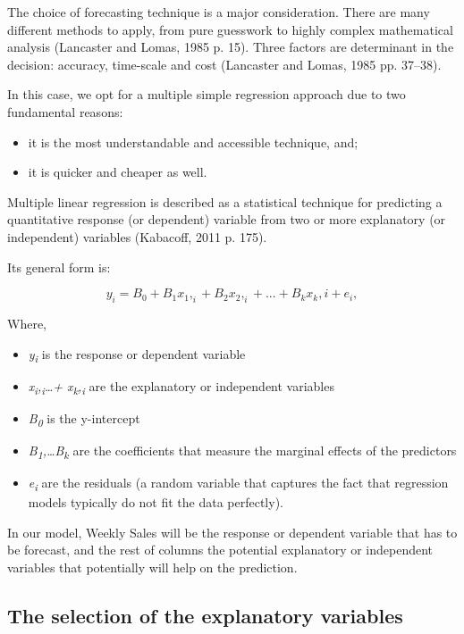 \documentclass[11pt,]{article}
\providecommand{\tightlist}{%
  \setlength{\itemsep}{0pt}\setlength{\parskip}{0pt}}
\begin{document}
The choice of forecasting technique is a major consideration. There are
many different methods to apply, from pure guesswork to highly complex
mathematical analysis (Lancaster and Lomas, 1985 p. 15). Three factors
are determinant in the decision: accuracy, time-scale and cost
(Lancaster and Lomas, 1985 pp. 37--38).

In this case, we opt for a multiple simple regression approach due to
two fundamental reasons:

\begin{itemize}
\item
  it is the most understandable and accessible technique, and;
\item
  it is quicker and cheaper as well.
\end{itemize}

Multiple linear regression is described as a statistical technique for
predicting a quantitative response (or dependent) variable from two or
more explanatory (or independent) variables (Kabacoff, 2011 p. 175).

Its general form is:

\[{y_i} = {B}_0 + {B}_1{x}_1,_i + {B}_2{x}_2,_i+...+ {B}_k{x}_k,i + {e}_i,\]

Where,

\begin{itemize}
\tightlist
\item
  \emph{y\textsubscript{i}} is the response or dependent variable
\item
  \emph{x\textsubscript{i},\textsubscript{i}\ldots{}+
  x\textsubscript{k},\textsubscript{i}} are the explanatory or
  independent variables
\item
  \emph{B\textsubscript{0}} is the y-intercept
\item
  \emph{B\textsubscript{1},\ldots{}B\textsubscript{k}} are the
  coefficients that measure the marginal effects of the predictors
\item
  \emph{e\textsubscript{i}} are the residuals (a random variable that
  captures the fact that regression models typically do not fit the data
  perfectly).
\end{itemize}

In our model, Weekly Sales will be the response or dependent variable
that has to be forecast, and the rest of columns the potential
explanatory or independent variables that potentially will help on the
prediction.

\subsection{The selection of the explanatory
variables}\label{the-selection-of-the-explanatory-variables}
\end{document}
